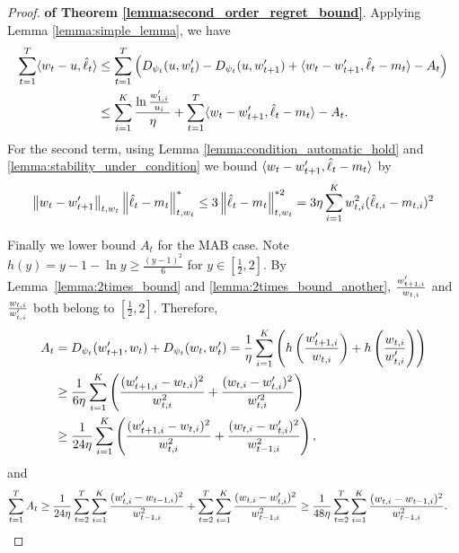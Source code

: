\begin{proof}{\textbf{of Theorem \ref{lemma:second_order_regret_bound}}.}
Applying Lemma \ref{lemma:simple_lemma}, we have 
\begin{align*}
\sum_{t=1}^T\langle {w_t-u, \hat{\ell}_t} \rangle &\leq \sum_{t=1}^T \left(D_{\psi_t}(u,w_{t}^\prime)-D_{\psi_t}(u,w_{t+1}^\prime)+\langle {w_t-w_{t+1}^\prime, \hat{\ell}_t-m_t} \rangle-A_t\right) \\
&\leq \sum_{i=1}^K \frac{\ln \frac{w_{1,i}^\prime}{u_i}}{\eta} +\sum_{t=1}^T \langle {w_t-w_{t+1}^\prime, \hat{\ell}_t-m_t} \rangle-A_t .
\end{align*}
For the second term, using Lemma \ref{lemma:condition_automatic_hold} and \ref{lemma:stability_under_condition} we bound $\langle {w_t-w_{t+1}^\prime, \hat{\ell}_t-m_t} \rangle$ by
\begin{align*}
\left\lVert w_t-w_{t+1}^\prime\right\rVert_{t,w_t}\left\lVert\hat{\ell}_t-m_t\right\rVert_{t,w_t}^* 
\leq 3\left\lVert\hat{\ell}_t-m_t\right\rVert_{t,w_t}^{*2} = 3\eta\sum_{i=1}^K w_{t,i}^2(\hat{\ell}_{t,i}-m_{t,i})^2
\end{align*}

Finally we lower bound $A_t$ for the MAB case. Note $h(y)=y-1-\ln y\geq \frac{(y-1)^2}{6}$ for $y\in [\frac{1}{2},2]$. By Lemma~\ref{lemma:2times_bound} and \ref{lemma:2times_bound_another}, $\frac{w_{t+1,i}^\prime}{w_{t,i}}$ and $\frac{w_{t,i}}{w_{t,i}^\prime}$ both belong to $[\frac{1}{2},2]$. Therefore, 
\begin{align*}
A_t&=D_{\psi_t}(w_{t+1}^\prime, w_t)+D_{\psi_t}(w_t, w_t^\prime)=\frac{1}{\eta} \sum_{i=1}^K \left(h\left(\frac{w_{t+1,i}^\prime}{w_{t,i}}\right) +h\left(\frac{w_{t,i}}{w_{t,i}^\prime}\right)\right) \\
&\geq \frac{1}{6\eta} \sum_{i=1}^K \left( \frac{(w_{t+1,i}^\prime-w_{t,i})^2}{w_{t,i}^2} + \frac{(w_{t,i}-w_{t,i}^\prime)^2}{w_{t,i}^{\prime 2}} \right) \\
&\geq \frac{1}{24\eta} \sum_{i=1}^K \left( \frac{(w_{t+1,i}^\prime-w_{t,i})^2}{w_{t,i}^2} + \frac{(w_{t,i}-w_{t,i}^\prime)^2}{w_{t-1,i}^2} \right), 
\end{align*}
and 
\begin{align*}
\sum_{t=1}^T A_t &\geq \frac{1}{24\eta}\sum_{t=2}^{T}\sum_{i=1}^K\frac{(w_{t,i}^\prime-w_{t-1,i})^2}{w_{t-1,i}^2}+\sum_{t=2}^T \sum_{i=1}^K \frac{(w_{t,i}-w_{t,i}^\prime)^2}{w_{t-1,i}^2}\geq \frac{1}{48\eta}\sum_{t=2}^T \sum_{i=1}^K \frac{(w_{t,i}-w_{t-1,i})^2}{w_{t-1,i}^2}. 
\end{align*}
\end{proof}

